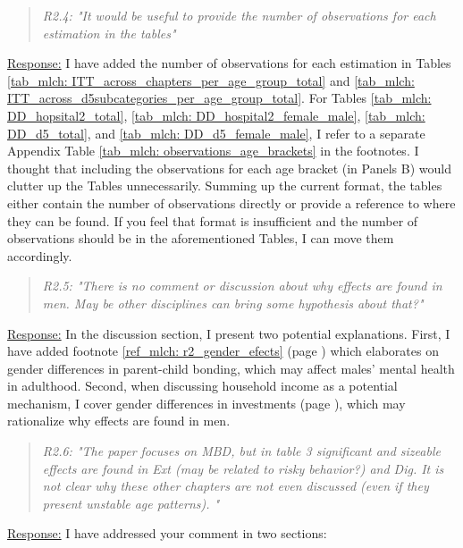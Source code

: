 \bigskip
{}
\begin{quote}
	\textit{R2.4: "It  would be useful to provide the number of observations for each estimation in the tables"}
\end{quote}
\underline{Response:} I have added the number of observations for each estimation in Tables \ref{tab_mlch: ITT_across_chapters_per_age_group_total} and \ref{tab_mlch: ITT_across_d5subcategories_per_age_group_total}. For Tables \ref{tab_mlch: DD_hopsital2_total}, \ref{tab_mlch: DD_hospital2_female_male}, \ref{tab_mlch: DD_d5_total}, and \ref{tab_mlch: DD_d5_female_male}, I refer to a separate Appendix Table \ref{tab_mlch: observations_age_brackets} in the footnotes. I thought that including the observations for each age bracket (in Panels B) would clutter up the Tables unnecessarily. Summing up the current format, the tables either contain the number of observations directly or provide a reference to where they can be found. If you feel that format is insufficient and the number of observations should be in the aforementioned Tables, I can move them accordingly.




\bigskip
{}
\begin{quote}
	\textit{R2.5: "There is no comment or discussion about why effects are found in men. May be other disciplines can bring some hypothesis about that?"}
\end{quote}
\underline{Response:}
In the discussion section, I present two potential explanations. First, I have added footnote \ref{ref_mlch: r2_gender_efects} (page \pageref{ref_mlch: r2_gender_efects}) which elaborates on gender differences in parent-child bonding, which may affect males' mental health in adulthood. Second, when discussing household income as a potential mechanism, I cover gender differences in investments (page \pageref{ref_mlch: r2_gender_diff_investments}), which may rationalize why effects are found in men. 







\bigskip
{}
\begin{quote}
	\textit{R2.6: "The paper focuses on MBD, but in table 3 significant and sizeable effects are found in Ext (may be related to risky behavior?) and Dig. It is not clear why these other chapters are not even discussed (even if they present unstable age patterns). "}
\end{quote}
\underline{Response:} I have addressed your comment in two sections:

